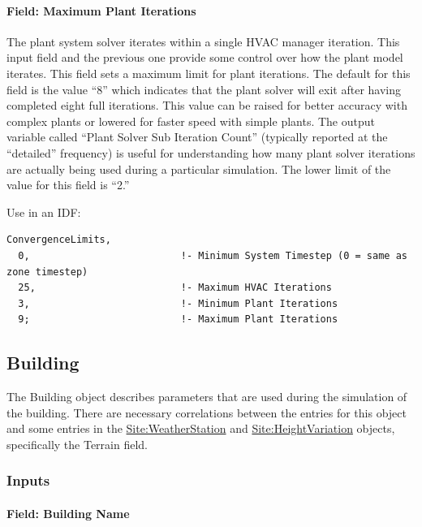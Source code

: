 \paragraph{Field: Maximum Plant Iterations}\label{field-maximum-plant-iterations}

The plant system solver iterates within a single HVAC manager iteration. This input field and the previous one provide some control over how the plant model iterates. This field sets a maximum limit for plant iterations. The default for this field is the value ``8'' which indicates that the plant solver will exit after having completed eight full iterations. This value can be raised for better accuracy with complex plants or lowered for faster speed with simple plants. The output variable called ``Plant Solver Sub Iteration Count'' (typically reported at the ``detailed'' frequency) is useful for understanding how many plant solver iterations are actually being used during a particular simulation. The lower limit of the value for this field is ``2.''

Use in an IDF:

\begin{lstlisting}
ConvergenceLimits,
  0,                          !- Minimum System Timestep (0 = same as zone timestep)
  25,                         !- Maximum HVAC Iterations
  3,                          !- Minimum Plant Iterations
  9;                          !- Maximum Plant Iterations
\end{lstlisting}

\subsection{Building}\label{building}

The Building object describes parameters that are used during the simulation of the building. There are necessary correlations between the entries for this object and some entries in the \hyperref[siteweatherstation]{Site:WeatherStation} and \hyperref[siteheightvariation]{Site:HeightVariation} objects, specifically the Terrain field.

\subsubsection{Inputs}\label{inputs-3-034}

\paragraph{Field: Building Name}\label{field-building-name}

